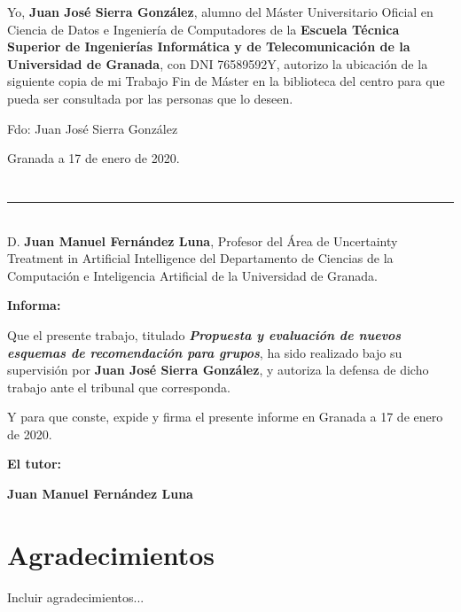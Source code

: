 Yo, \textbf{Juan José Sierra González}, alumno del Máster Universitario Oficial en Ciencia de Datos e Ingeniería de Computadores de la \textbf{Escuela Técnica Superior de Ingenierías Informática y de Telecomunicación de la Universidad de Granada}, con DNI 76589592Y, autorizo la
ubicación de la siguiente copia de mi Trabajo Fin de Máster en la biblioteca del centro para que pueda ser
consultada por las personas que lo deseen.

\vspace{6cm}

\noindent Fdo: Juan José Sierra González

\vspace{2cm}

\begin{flushright}
Granada a 17 de enero de 2020.
\end{flushright}


\chapter*{}
\thispagestyle{empty}

\noindent\rule[-1ex]{\textwidth}{2pt}\\[4.5ex]

D. \textbf{Juan Manuel Fernández Luna}, Profesor del Área de Uncertainty Treatment in Artificial Intelligence del Departamento de Ciencias de la Computación e Inteligencia Artificial de la Universidad de Granada.

\vspace{0.5cm}

\textbf{Informa:}

\vspace{0.5cm}

Que el presente trabajo, titulado \textit{\textbf{Propuesta y evaluación de nuevos esquemas de recomendación para grupos}},
ha sido realizado bajo su supervisión por \textbf{Juan José Sierra González}, y autoriza la defensa de dicho trabajo ante el tribunal
que corresponda.

\vspace{0.5cm}

Y para que conste, expide y firma el presente informe en Granada a 17 de enero de 2020.

\vspace{1cm}

\textbf{El tutor:}

\vspace{5cm}

\noindent \textbf{Juan Manuel Fernández Luna}

\chapter*{Agradecimientos}
\thispagestyle{empty}

\vspace{1cm}

Incluir agradecimientos...